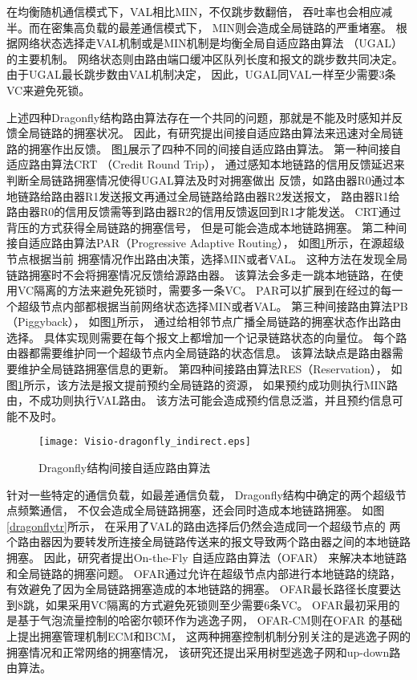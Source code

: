 在均衡随机通信模式下，VAL相比MIN，不仅跳步数翻倍，
吞吐率也会相应减半。而在密集高负载的最差通信模式下，
MIN则会造成全局链路的严重堵塞。
根据网络状态选择走VAL机制或是MIN机制是均衡全局自适应路由算法
（UGAL）的主要机制。
网络状态则由路由端口缓冲区队列长度和报文的跳步数共同决定。
由于UGAL最长跳步数由VAL机制决定，
因此，UGAL同VAL一样至少需要3条VC来避免死锁。

上述四种Dragonfly结构路由算法存在一个共同的问题，那就是不能及时感知并反馈全局链路的拥塞状况。
因此，有研究提出间接自适应路由算法来迅速对全局链路的拥塞作出反馈。
图\ref{dragonflyir}展示了四种不同的间接自适应路由算法。
第一种间接自适应路由算法CRT （Credit Round Trip），
通过感知本地链路的信用反馈延迟来判断全局链路拥塞情况使得UGAL算法及时对拥塞做出
反馈，如路由器R0通过本地链路给路由器R1发送报文再通过全局链路给路由器R2发送报文，
路由器R1给路由器R0的信用反馈需等到路由器R2的信用反馈返回到R1才能发送。
CRT通过背压的方式获得全局链路的拥塞信号，
但是可能会造成本地链路拥塞。
第二种间接自适应路由算法PAR（Progressive Adaptive Routing），
如图\ref{dragonflyir}所示，在源超级节点根据当前
拥塞情况作出路由决策，选择MIN或者VAL。
这种方法在发现全局链路拥塞时不会将拥塞情况反馈给源路由器。
该算法会多走一跳本地链路，在使用VC隔离的方法来避免死锁时，需要多一条VC。
PAR可以扩展到在经过的每一个超级节点内部都根据当前网络状态选择MIN或者VAL。
第三种间接路由算法PB（Piggyback），
如图\ref{dragonflyir}所示，
通过给相邻节点广播全局链路的拥塞状态作出路由选择。
具体实现则需要在每个报文上都增加一个记录链路状态的向量位。
每个路由器都需要维护同一个超级节点内全局链路的状态信息。
该算法缺点是路由器需要维护全局链路拥塞信息的更新。
第四种间接路由算法RES（Reservation），
如图\ref{dragonflyir}所示，该方法是报文提前预约全局链路的资源，
如果预约成功则执行MIN路由，不成功则执行VAL路由。
该方法可能会造成预约信息泛滥，并且预约信息可能不及时。

\begin{figure}[htp]
  \centering
    \texttt{[image: Visio-dragonfly\_indirect.eps]}
    \caption{Dragonfly结构间接自适应路由算法}
       \label{dragonflyir}
\end{figure}

针对一些特定的通信负载，如最差通信负载，
Dragonfly结构中确定的两个超级节点频繁通信，
不仅会造成全局链路拥塞，还会同时造成本地链路拥塞。
如图\ref{dragonflytr}所示，
在采用了VAL的路由选择后仍然会造成同一个超级节点的
两个路由器因为要转发所连接全局链路传送来的报文导致两个路由器之间的本地链路拥塞。
因此，研究者提出On-the-Fly 自适应路由算法（OFAR）
来解决本地链路和全局链路的拥塞问题。
OFAR通过允许在超级节点内部进行本地链路的绕路，
有效避免了因为全局链路拥塞造成的本地链路的拥塞。
OFAR最长路径长度要达到8跳，如果采用VC隔离的方式避免死锁则至少需要6条VC。
OFAR最初采用的是基于气泡流量控制的哈密尔顿环作为逃逸子网，
OFAR-CM则在OFAR 的基础上提出拥塞管理机制ECM和BCM，
这两种拥塞控制机制分别关注的是逃逸子网的拥塞情况和正常网络的拥塞情况，
该研究还提出采用树型逃逸子网和up-down路由算法。

